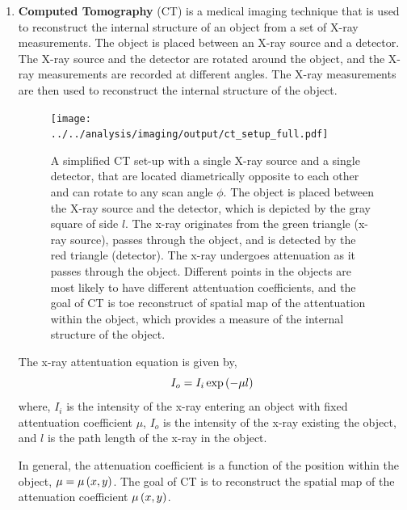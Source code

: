 \documentclass[12pt]{article}
\def\mf{\ensuremath\mathbf}
\def\lp{\ensuremath\left(}
\def\rp{\ensuremath\right)}
\newcommand{\ct}[1]{\lp #1\rp}
\begin{document}
\begin{enumerate}

\item \textbf{Computed Tomography} (CT) is a medical imaging technique that is used to reconstruct the internal structure of an object from a set of X-ray measurements. The object is placed between an X-ray source and a detector. The X-ray source and the detector are rotated around the object, and the X-ray measurements are recorded at different angles. The X-ray measurements are then used to reconstruct the internal structure of the object.
\begin{figure}[h]
    \centering
    \texttt{[image: ../../analysis/imaging/output/ct\_setup\_full.pdf]}
    \caption{A simplified CT set-up with a single X-ray source and a single detector, that are located diametrically opposite to each other and can rotate to any scan angle $\phi$. The object is placed between the X-ray source and the detector, which is depicted by the gray square of side $l$. The x-ray originates from the green triangle (x-ray source), passes through the object, and is detected by the red triangle (detector). The x-ray undergoes attenuation as it passes through the object. Different points in the objects are most likely to have different attentuation coefficients, and the goal of CT is toe reconstruct of spatial map of the attentuation within the object, which provides a measure of the internal structure of the object.}
    \label{fig:ct}
\end{figure}

The x-ray attentuation equation is given by,
\[ I_o = I_i \exp\lp -\mu l \rp \]
where, $I_i$ is the intensity of the x-ray entering an object with fixed attentuation coefficient $\mu$, $I_o$ is the intensity of the x-ray existing the object, and $l$ is the path length of the x-ray in the object. 

In general, the attenuation coefficient is a function of the position within the object, $\mu = \mu\ct{x,y}$. The goal of CT is to reconstruct the spatial map of the attenuation coefficient $\mu\ct{x,y}$.


\end{enumerate}
\end{document}
